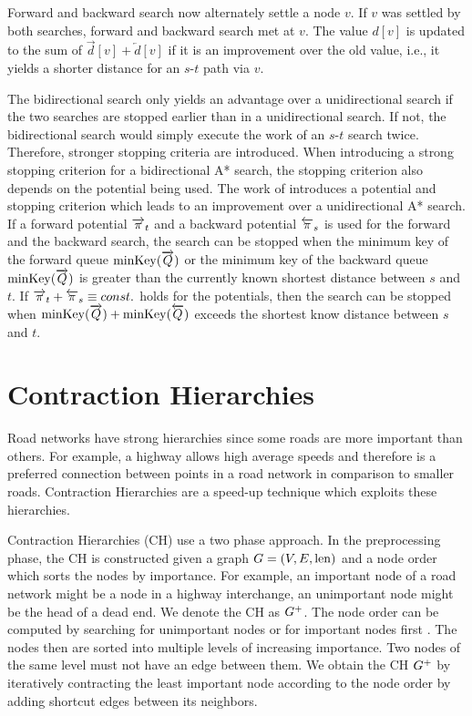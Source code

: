 Forward and backward search now alternately settle a node $v$. If $v$ was settled by both searches, forward and backward search met at $v$. The value $d[v]$ is updated to the sum of $\overrightarrow{d}[v] + \overleftarrow{d}[v]$ if it is an improvement over the old value, i.e., it yields a shorter distance for an $s$-$t$ path via $v$.

The bidirectional search only yields an advantage over a unidirectional search if the two searches are stopped earlier than in a unidirectional search. If not, the bidirectional search would simply execute the work of an $s$-$t$ search twice. Therefore, stronger stopping criteria are introduced. When introducing a strong stopping criterion for a bidirectional A* search, the stopping criterion also depends on the potential being used. The work of \cite{goldberg:2005a} introduces a potential and stopping criterion which leads to an improvement over a unidirectional A* search. If a forward potential $\overrightarrow{\pi}_t$ and a backward potential $\overleftarrow{\pi}_s$ is used for the forward and the backward search, the search can be stopped when the minimum key of the forward queue $\operatorname{minKey}(\overrightarrow{Q})$ or the minimum key of the backward queue $\operatorname{minKey}(\overrightarrow{Q})$ is greater than the currently known shortest distance between $s$ and $t$. If $\overrightarrow{\pi}_t + \overleftarrow{\pi}_s \equiv const.$ holds for the potentials, then the search can be stopped when $\operatorname{minKey}(\overrightarrow{Q}) + \operatorname{minKey}(\overleftarrow{Q})$ exceeds the shortest know distance between $s$ and $t$.

\section{Contraction Hierarchies\label{sec:ch}}
Road networks have strong hierarchies since some roads are more important than others. For example, a highway allows high average speeds and therefore is a preferred connection between points in a road network in comparison to smaller roads. Contraction Hierarchies \cite{geisberger:2012} are a speed-up technique which exploits these hierarchies.

Contraction Hierarchies (CH) use a two phase approach. In the preprocessing phase, the CH is constructed given a graph $G=(V,E,\operatorname{len})$ and a node order which sorts the nodes by importance. For example, an important node of a road network might be a node in a highway interchange, an unimportant node might be the head of a dead end. We denote the CH as $G^+$. The node order can be computed by searching for unimportant nodes \cite{geisberger:2012} or for important nodes first \cite{abraham:2012,delling:2014}. The nodes then are sorted into multiple levels of increasing importance. Two nodes of the same level must not have an edge between them. We obtain the CH $G^+$ by iteratively contracting the least important node according to the node order by adding shortcut edges between its neighbors.


